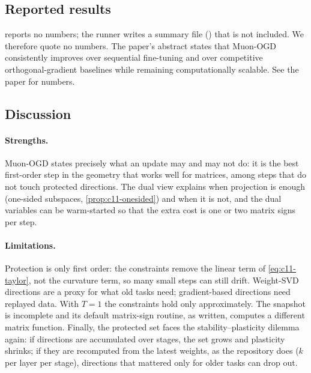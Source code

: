 \subsection{Reported results}\label{sec:c11-mo-results}

\begin{results}
 reports no numbers; the runner writes a summary file
() that is not included. We therefore quote no numbers. The paper's
abstract states that Muon-OGD consistently improves over sequential fine-tuning and over
competitive orthogonal-gradient baselines while remaining computationally scalable. See the
paper for numbers.
\end{results}

\subsection{Discussion}\label{sec:c11-mo-discussion}

\paragraph{Strengths.} Muon-OGD states precisely what an update may and may not do: it is the best
first-order step in the geometry that works well for matrices, among steps that do not touch
protected directions. The dual view explains when projection is enough (one-sided subspaces,
\cref{prop:c11-onesided}) and when it is not, and the dual variables can be warm-started so that
the extra cost is one or two matrix signs per step.

\paragraph{Limitations.} Protection is only first order: the constraints remove the linear term of
\cref{eq:c11-taylor}, not the curvature term, so many small steps can still drift. Weight-SVD
directions are a proxy for what old tasks need; gradient-based directions need replayed data.
With $T = 1$ the constraints hold only approximately. The snapshot is incomplete and its default
matrix-sign routine, as written, computes a different matrix function. Finally, the protected set
faces the stability--plasticity dilemma again: if directions are accumulated over stages, the set
grows and plasticity shrinks; if they are recomputed from the latest weights, as the repository
does ($k$ per layer per stage), directions that mattered only for older tasks can drop out.

